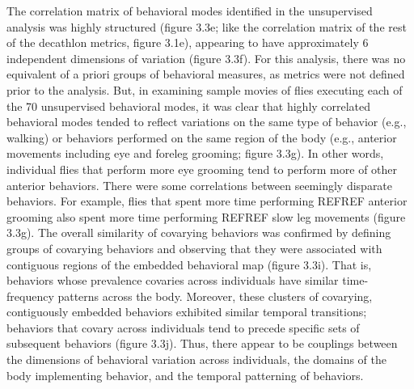\documentclass[12pt,letterpaper]{article}
\begin{document}
The correlation matrix of behavioral modes identified in the unsupervised analysis was highly structured (figure 3.3e; like the correlation matrix of the rest of the decathlon metrics, figure 3.1e), appearing to have approximately 6 independent dimensions of variation (figure 3.3f). For this analysis, there was no equivalent of a priori groups of behavioral measures, as metrics were not defined prior to the analysis. But, in examining sample movies of flies executing each of the 70 unsupervised behavioral modes, it was clear that highly correlated behavioral modes tended to reflect variations on the same type of behavior (e.g., walking) or behaviors performed on the same region of the body (e.g., anterior movements including eye and foreleg grooming; figure 3.3g). In other words, individual flies that perform more eye grooming tend to perform more of other anterior behaviors. There were some correlations between seemingly disparate behaviors. For example, flies that spent more time performing REFREF anterior grooming also spent more time performing REFREF slow leg movements (figure 3.3g). The overall similarity of covarying behaviors was confirmed by defining groups of covarying behaviors and observing that they were associated with contiguous regions of the embedded behavioral map (figure 3.3i). That is, behaviors whose prevalence covaries across individuals have similar time-frequency patterns across the body. Moreover, these clusters of covarying, contiguously embedded behaviors exhibited similar temporal transitions; behaviors that covary across individuals tend to precede specific sets of subsequent behaviors (figure 3.3j). Thus, there appear to be couplings between the dimensions of behavioral variation across individuals, the domains of the body implementing behavior, and the temporal patterning of behaviors. 
\end{document}
